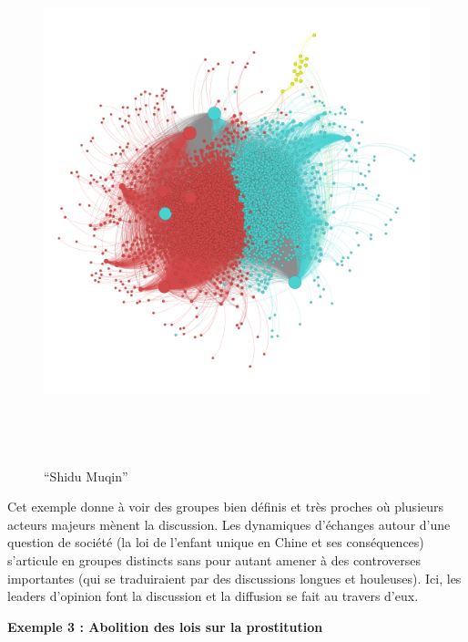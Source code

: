 \begin{figure}[h!]
    \centering
    \includegraphics[width=6.0114in,height=6.0114in]{figures/chap3/chapitre3-img18.png}
    \caption{{\textquotedblleft}Shidu Muqin{\textquotedblright}}
    \label{fig:shidumuqin}
\end{figure}



Cet exemple donne à voir des groupes bien définis et très proches o\`u plusieurs acteurs majeurs mènent la discussion. Les dynamiques d{\textquoteright}échanges autour d{\textquoteright}une question de société (la loi de l{\textquoteright}enfant unique en Chine et ses conséquences) s{\textquoteright}articule en groupes distincts sans pour autant amener à des controverses importantes (qui se traduiraient par des discussions longues et houleuses). Ici, les leaders d{\textquoteright}opinion font la discussion et la diffusion se fait au travers d{\textquoteright}eux.

\clearpage
\textbf{Exemple 3 : Abolition des lois sur la prostitution}


